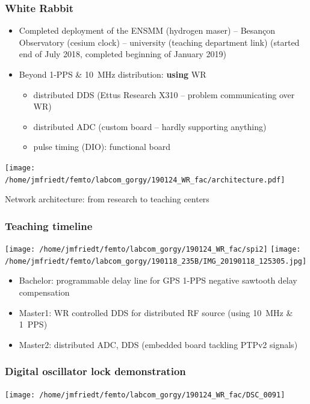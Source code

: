 \documentclass[compress,10pt]{beamer}
\begin{document}
\begin{frame}\frametitle{White Rabbit}

\begin{itemize}
\item
Completed deployment of the ENSMM (hydrogen maser) -- Besan\c con Observatory (cesium clock) -- university (teaching department link)
(started end of July 2018, completed beginning of January 2019)
\item Beyond 1-PPS \& 10~MHz distribution: {\bf using} WR
\begin{itemize}
\item distributed DDS (Ettus Research X310 -- problem communicating over WR)
\item distributed ADC (custom board -- hardly supporting anything)
\item pulse timing (DIO): functional board
\end{itemize}
\end{itemize}

\texttt{[image: /home/jmfriedt/femto/labcom\_gorgy/190124\_WR\_fac/architecture.pdf]}

Network architecture: from research to teaching centers

\end{frame}
\begin{frame}\frametitle{Teaching timeline}

\vfill

\texttt{[image: /home/jmfriedt/femto/labcom\_gorgy/190124\_WR\_fac/spi2]} %
\texttt{[image: /home/jmfriedt/femto/labcom\_gorgy/190118\_235B/IMG\_20190118\_125305.jpg]} %
\vfill

\begin{itemize}
\item Bachelor: programmable delay line for GPS 1-PPS negative sawtooth delay compensation
\item Master1: WR controlled DDS for distributed RF source (using 10~MHz \& 1~PPS)
\item Master2: distributed ADC, DDS (embedded board tackling PTPv2 signals)
\end{itemize}

\end{frame}
\begin{frame}\frametitle{Digital oscillator lock demonstration}

\texttt{[image: /home/jmfriedt/femto/labcom\_gorgy/190124\_WR\_fac/DSC\_0091]}
\end{frame}
\end{document}
